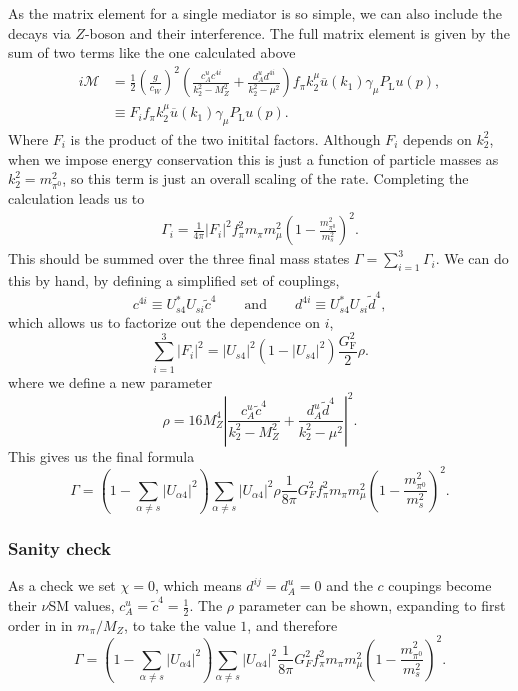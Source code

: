 \documentclass[11pt, a4paper]{article}
\begin{document}
As the matrix element for a single mediator is so simple, we can also include the decays via
$Z$-boson and their interference. The full matrix element is given by the sum of two terms like the one calculated above
%
\begin{align*}
%
i\mathcal{M} &= \frac{1}{2}\left(\frac{g}{c_W}\right)^2\left(\frac{c^u_A c^{4i}}{k_2^2-M_Z^2} + \frac{d^u_A d^{4i} }{k_2^2-\mu^2} \right) f_\pi k_2^\mu \overline{u}(k_1) \gamma_\mu P_\text{L} u(p),\\
%
&\equiv F_i f_\pi k_2^\mu 
\overline{u}(k_1) \gamma_\mu P_\text{L} u(p). 
%
\end{align*}
%
Where $F_i$ is the product of the two initital factors. Although $F_i$ depends on $k_2^2$, when we impose energy conservation this is just a function of particle masses as $k_2^2=m_{\pi^0}^2$, so this term is just an overall scaling of the rate. Completing the calculation leads us to 
%
\begin{align*}
%
\Gamma_i = \frac{1}{4\pi}\left|F_i\right|^2 f^2_\pi m_\pi m_\mu^2\left(1-\frac{m^2_{\pi^0}}{m^2_s}\right)^2.
%
\end{align*}
%
This should be summed over the three final mass states $\Gamma = \sum_{i=1}^3 \Gamma_i$. We can do this by hand, by defining a simplified set of couplings,
%
\[   c^{4i} \equiv U_{s4}^*U_{si}\widetilde{c}^4\qquad \text{and}\qquad  d^{4i} \equiv U_{s4}^*U_{si}\widetilde{d}^4, \]
%
which allows us to factorize out the dependence on $i$, 
%
\[ \sum_{i=1}^3\left| F_i\right|^2 = |U_{s4}|^2\left(1-|U_{s4}|^2\right) \frac{G_\text{F}^2}{2} \rho. \]
%
where we define a new parameter 
%
\[  \rho = 16M_Z^4 \left |\frac{c^u_A \widetilde{c}^{4}}{k_2^2-M_Z^2} + \frac{d^u_A \widetilde{d}^{4} }{k_2^2-\mu^2} \right|^2. \] 
%
This gives us the final formula
%
\[  \Gamma =  \left(1-\sum_{\alpha \neq s}  |U_{\alpha 4}|^2\right) \sum_{\alpha \neq s} |U_{\alpha 4}|^2 \rho \frac{1}{8\pi} G_F^2 f^2_\pi m_\pi m_\mu^2\left(1-\frac{m^2_{\pi^0}}{m^2_s}\right)^2. \]

\subsubsection{Sanity check}

As a check we set $\chi=0$, which means $d^{ij}=d^u_A=0$ and the $c$ coupings
become their $\nu$SM values, $c^u_A = \widetilde{c}^4 = \frac{1}{2}$.
%
The $\rho$ parameter can be shown, expanding to first order in in $m_\pi/M_Z$, to take the value $1$,%
%
and therefore
%
\[  \Gamma =  \left(1-\sum_{\alpha \neq s}  |U_{\alpha 4}|^2\right) \sum_{\alpha \neq s} |U_{\alpha 4}|^2 \frac{1}{8\pi} G_F^2 f^2_\pi m_\pi m_\mu^2\left(1-\frac{m^2_{\pi^0}}{m^2_s}\right)^2. \]
\end{document}
